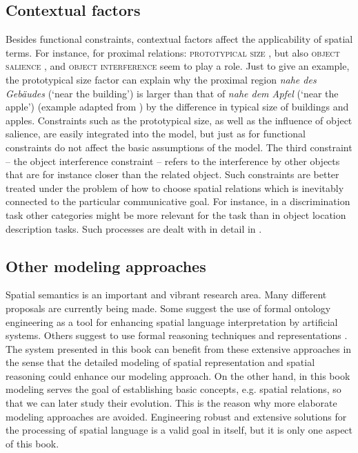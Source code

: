 \subsection{Contextual factors}
Besides functional constraints, contextual factors affect the
applicability of spatial terms. For instance, for proximal relations: 
\textsc{prototypical size} \citep{gapp1994basic}, but also 
\textsc{object salience} \citep{regier2001grounding}, and \textsc{object interference} 
\citep{kelleher2009dialog} seem to play a role.
Just to give an example, the prototypical size factor can explain
why the proximal region \textit{nahe des Geb\"audes}
(`near the building') is larger than that of \textit{nahe dem Apfel} (`near the apple') 
(example adapted from \citealt{gapp1994basic}) by the difference in typical 
size of buildings and apples. 
Constraints such as the prototypical size, as well as the influence of
object salience, are easily integrated into the model, but just as 
for functional constraints do not affect the basic assumptions
of the model. The third constraint -- the object interference constraint --
refers to the interference by other objects that are for
instance closer than the related object. Such constraints are better treated 
under the problem of how to choose spatial relations which is inevitably
connected to the particular communicative goal. 
For instance, in a discrimination task other categories
might be more relevant for the task than in object location description tasks.
Such processes are dealt with in detail in .


\subsection{Other modeling approaches}
Spatial semantics is an important and vibrant research area. 
Many different proposals are currently being made. Some suggest 
the use of formal ontology engineering \citep{bateman2007role,bateman2010situating,bateman2010ontology}
as a tool for enhancing spatial language interpretation by artificial 
systems. Others suggest to use formal reasoning techniques
and representations \citep{freksa1991qualitative,cohn2001qualitative}.
The system presented in this book can benefit from these
extensive approaches in the sense that the detailed modeling 
of spatial representation and spatial reasoning could enhance
our modeling approach. On the other hand, in this book modeling 
serves the goal of establishing basic concepts, e.g. spatial relations,
so that we can later study their evolution. This is the
reason why more elaborate modeling approaches are avoided. Engineering
robust and extensive solutions for the processing of spatial
language is a valid goal in itself, but it is only one aspect of 
this book.

